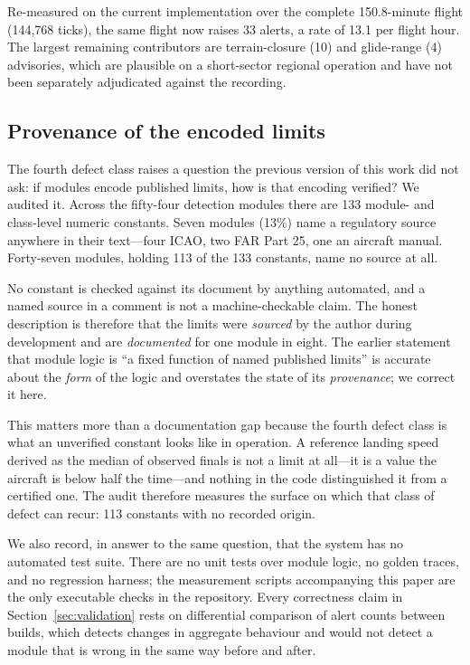 \documentclass[conference]{IEEEtran}
\begin{document}
Re-measured on the current implementation over the complete 150.8-minute
flight (144{,}768 ticks), the same flight now raises 33 alerts, a rate of
13.1 per flight hour. The largest remaining contributors are terrain-closure
(10) and glide-range (4) advisories, which are plausible on a short-sector
regional operation and have not been separately adjudicated against the
recording.

\subsection{Provenance of the encoded limits}
\label{sec:provenance}

The fourth defect class raises a question the previous version of this work did
not ask: if modules encode published limits, how is that encoding verified? We
audited it. Across the fifty-four detection modules there are 133 module- and
class-level numeric constants. Seven modules (13\%) name a regulatory source
anywhere in their text---four ICAO, two FAR Part 25, one an aircraft manual.
Forty-seven modules, holding 113 of the 133 constants, name no source at all.

No constant is checked against its document by anything automated, and a named
source in a comment is not a machine-checkable claim. The honest description
is therefore that the limits were \emph{sourced} by the author during
development and are \emph{documented} for one module in eight. The earlier
statement that module logic is ``a fixed function of named published limits''
is accurate about the \emph{form} of the logic and overstates the state of its
\emph{provenance}; we correct it here.

This matters more than a documentation gap because the fourth defect class is
what an unverified constant looks like in operation. A reference landing speed
derived as the median of observed finals is not a limit at all---it is a value
the aircraft is below half the time---and nothing in the code distinguished it
from a certified one. The audit therefore measures the surface on which that
class of defect can recur: 113 constants with no recorded origin.

We also record, in answer to the same question, that the system has no
automated test suite. There are no unit tests over module logic, no golden
traces, and no regression harness; the measurement scripts accompanying this
paper are the only executable checks in the repository. Every correctness
claim in Section~\ref{sec:validation} rests on differential comparison of
alert counts between builds, which detects changes in aggregate behaviour and
would not detect a module that is wrong in the same way before and after.
\end{document}
